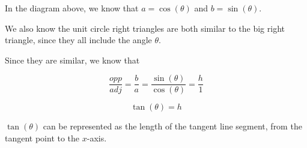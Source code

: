 \documentclass{ximera}
\begin{document}
\begin{image}
\end{image}




In the diagram above, we know that $a = \cos(\theta)$ and $b = \sin(\theta)$.

We also know the unit circle right triangles are both similar to the big right triangle, since they all include the angle $\theta$.

Since they are similar, we know that 


\[    \frac{opp}{adj} = \frac{b}{a}  = \frac{\sin(\theta)}{\cos(\theta)}   = \frac{h}{1}          \]


\[         \tan(\theta) = h\]




$\tan(\theta)$ can be represented as the length of the tangent line segment, from the tangent point to the $x$-axis.
\end{document}
